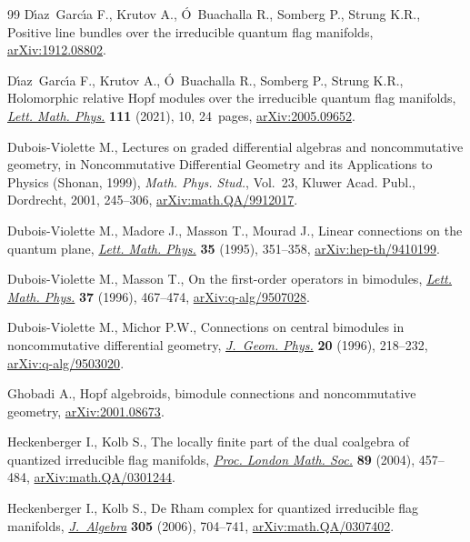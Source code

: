 \documentclass[pdftex]{sigma}
\numberwithin{equation}{section}
\begin{document}
\begin{thebibliography}{99}
D\'{\i}az~Garc\'{\i}a F., Krutov A., \'O~Buachalla R., Somberg P., Strung K.R.,
 Positive line bundles over the irreducible quantum flag manifolds, \href{https://arxiv.org/abs/1912.08802}{arXiv:1912.08802}.

D\'{\i}az~Garc\'{\i}a F., Krutov A., \'O~Buachalla R., Somberg P., Strung K.R.,
 Holomorphic relative {H}opf modules over the irreducible quantum flag
 manifolds, \href{https://doi.org/10.1007/s11005-020-01340-7}{\textit{Lett. Math. Phys.}} \textbf{111} (2021), 10, 24~pages,
 \href{https://arxiv.org/abs/2005.09652}{arXiv:2005.09652}.

Dubois-Violette M., Lectures on graded differential algebras and noncommutative
 geometry, in Noncommutative Differential Geometry and its Applications to
 Physics ({S}honan, 1999), \textit{Math. Phys. Stud.}, Vol.~23, Kluwer Acad.
 Publ., Dordrecht, 2001, 245--306, \href{https://arxiv.org/abs/math.QA/9912017}{arXiv:math.QA/9912017}.

Dubois-Violette M., Madore J., Masson T., Mourad J., Linear connections on the
 quantum plane, \href{https://doi.org/10.1007/BF00750842}{\textit{Lett. Math. Phys.}} \textbf{35} (1995), 351--358,
 \href{https://arxiv.org/abs/hep-th/9410199}{arXiv:hep-th/9410199}.

Dubois-Violette M., Masson T., On the first-order operators in bimodules,
 \href{https://doi.org/10.1007/BF00312677}{\textit{Lett. Math. Phys.}} \textbf{37} (1996), 467--474,
 \href{https://arxiv.org/abs/q-alg/9507028}{arXiv:q-alg/9507028}.

Dubois-Violette M., Michor P.W., Connections on central bimodules in
 noncommutative differential geometry, \href{https://doi.org/10.1016/0393-0440(95)00057-7}{\textit{J.~Geom. Phys.}} \textbf{20}
 (1996), 218--232, \href{https://arxiv.org/abs/q-alg/9503020}{arXiv:q-alg/9503020}.

Ghobadi A., Hopf algebroids, bimodule connections and noncommutative geometry,
 \href{https://arxiv.org/abs/2001.08673}{arXiv:2001.08673}.

Heckenberger I., Kolb S., The locally finite part of the dual coalgebra of
 quantized irreducible flag manifolds, \href{https://doi.org/10.1112/S0024611504014777}{\textit{Proc. London Math. Soc.}}
 \textbf{89} (2004), 457--484, \href{https://arxiv.org/abs/math.QA/0301244}{arXiv:math.QA/0301244}.

Heckenberger I., Kolb S., De {R}ham complex for quantized irreducible flag
 manifolds, \href{https://doi.org/10.1016/j.jalgebra.2006.02.001}{\textit{J.~Algebra}} \textbf{305} (2006), 704--741,
 \href{https://arxiv.org/abs/math.QA/0307402}{arXiv:math.QA/0307402}.


\end{thebibliography}
\end{document}
